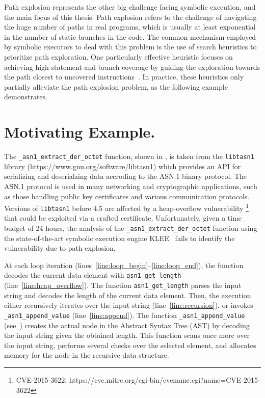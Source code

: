 Path explosion represents the other big challenge facing symbolic execution,
and the main focus of this thesis.
Path explosion refers to the challenge of navigating the huge number of paths in real programs,
which is usually at least exponential in the number of static branches in the code.
The common mechanism employed by symbolic executors to
deal with this problem is the use of search heuristics to prioritize path exploration.
One particularly effective heuristic focuses on
achieving high statement and branch coverage by guiding the
exploration towards the path closest to uncovered
instructions~\cite{exe,klee,sen:concolicheuristics,fitsymex:dsn09}.
In practice, these heuristics only partially alleviate the path
explosion problem, as the following example demonstrates.

\section{Motivating Example.}
The \texttt{\_asn1\_extract\_der\_octet} function, shown in ,
is taken from the \texttt{libtasn1} library (https://www.gnu.org/software/libtasn1)
which provides an API for serializing and deserialzing data accroding to the ASN.1 binary protocol.
The ASN.1 protocol is used in many networking and
cryptographic applications, such as those handling public key
certificates and various communication protocols.
Versions of \texttt{libtasn1} before 4.5 are affected by a heap-overflow 
vulnerability \footnote{CVE-2015-3622: https://cve.mitre.org/cgi-bin/cvename.cgi?name=CVE-2015-3622}
that could be exploited via a crafted certificate.
Unfortunately, given a time budget of 24 hours,
the analysis of the \texttt{\_asn1\_extract\_der\_octet} function using
the state-of-the-art symbolic execution engine KLEE~\cite{klee} fails
to identify the vulnerability due to path explosion.

At each loop iteration (lines~\ref{line:loop_begin}--\ref{line:loop_end}),
the function decodes the current data element with \texttt{asn1\_get\_length} (line~\ref{line:heap_overflow}).
The function \texttt{asn1\_get\_length} parses the input string and decodes the length of the current data element.
Then, the execution either recursively iterates over the input string (line~\ref{line:recursion}),
or invokes \texttt{\_asn1\_append\_value} (line~\ref{line:append}).
The function \texttt{\_asn1\_append\_value} (see~) creates the
actual node in the Abstract Syntax Tree (AST) by decoding the input
string given the obtained length. This function scans once more over
the input string, performs several checks over the selected element,
and allocates memory for the node in the recursive data structure.

